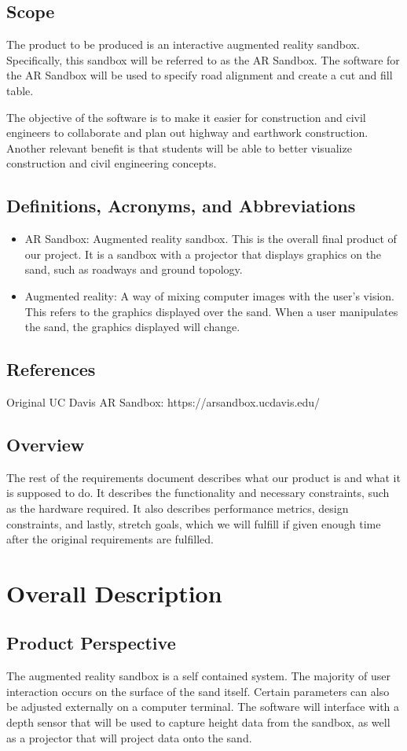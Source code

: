 \documentclass[onecolumn, draftclsnofoot,10pt, compsoc]{IEEEtran}
\begin{document}
\subsection{Scope}
The product to be produced is an interactive augmented reality sandbox. Specifically, this sandbox will be referred to as the AR Sandbox. The software for the AR Sandbox will be used to specify road alignment and create a cut and fill table.
\par The objective of the software is to make it easier for construction and civil engineers to collaborate and plan out highway and earthwork construction. Another relevant benefit is that students will be able to better visualize construction and civil engineering concepts.
\subsection{Definitions, Acronyms, and Abbreviations}
\begin{itemize}
\item AR Sandbox: Augmented reality sandbox. This is the overall final product of our project. It is a sandbox with a projector that displays graphics on the sand, such as roadways and ground topology.
\item Augmented reality: A way of mixing computer images with the user’s vision. This refers to the graphics displayed over the sand. When a user manipulates the sand, the graphics displayed will change.
\end{itemize}
\subsection{References}
Original UC Davis AR Sandbox: https://arsandbox.ucdavis.edu/
\subsection{Overview}
The rest of the requirements document describes what our product is and what it is supposed to do. It describes the functionality and necessary constraints, such as the hardware required. It also describes performance metrics, design constraints, and lastly, stretch goals, which we will fulfill if given enough time after the original requirements are fulfilled. 
\section{Overall Description} 
\subsection{Product Perspective}
The augmented reality sandbox is a self contained system. The majority of user interaction occurs on the surface of the sand itself. 
Certain parameters can also be adjusted externally on a computer terminal.
The software will interface with a depth sensor that will be used to capture height data from the sandbox, as well as a projector that will project data onto the sand.
\end{document}
